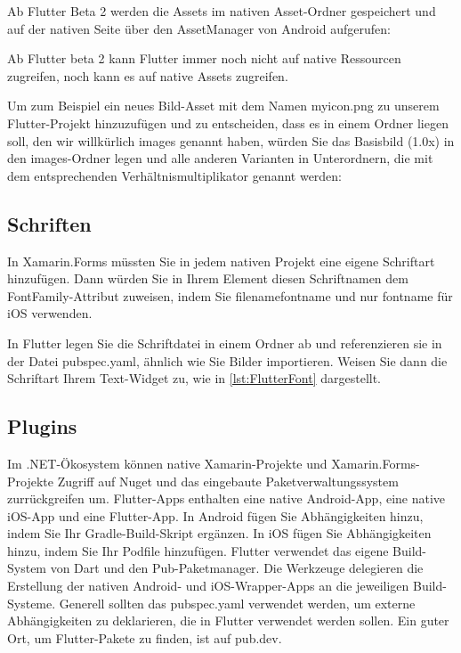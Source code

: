 Ab Flutter Beta 2 werden die Assets im nativen Asset-Ordner gespeichert und auf der nativen Seite über den AssetManager von Android aufgerufen:

Ab Flutter beta 2 kann Flutter immer noch nicht auf native Ressourcen zugreifen, noch kann es auf native Assets zugreifen.

Um zum Beispiel ein neues Bild-Asset mit dem Namen myicon.png zu unserem Flutter-Projekt hinzuzufügen und zu entscheiden, dass es in einem Ordner liegen soll, den wir willkürlich images genannt haben, würden Sie das Basisbild (1.0x) in den images-Ordner legen und alle anderen Varianten in Unterordnern, die mit dem entsprechenden Verhältnismultiplikator genannt werden:
\subsection{Schriften}
In Xamarin.Forms müssten Sie in jedem nativen Projekt eine eigene Schriftart hinzufügen. Dann würden Sie in Ihrem Element diesen Schriftnamen dem FontFamily-Attribut zuweisen, indem Sie filenamefontname und nur fontname für iOS verwenden.

In Flutter legen Sie die Schriftdatei in einem Ordner ab und referenzieren sie in der Datei pubspec.yaml, ähnlich wie Sie Bilder importieren.
Weisen Sie dann die Schriftart Ihrem Text-Widget zu, wie in  \ref{lst:FlutterFont} dargestellt. 

\begin{minipage}{\linewidth}

\end{minipage}

\subsection{Plugins}
Im .NET-Ökosystem können native Xamarin-Projekte und Xamarin.Forms-Projekte Zugriff auf Nuget und das eingebaute Paketverwaltungssystem zurrückgreifen um.  Flutter-Apps enthalten eine native Android-App, eine native iOS-App und eine Flutter-App.
In Android fügen Sie Abhängigkeiten hinzu, indem Sie Ihr Gradle-Build-Skript ergänzen. In iOS fügen Sie Abhängigkeiten hinzu, indem Sie Ihr Podfile hinzufügen.
Flutter verwendet das eigene Build-System von Dart und den Pub-Paketmanager. Die Werkzeuge delegieren die Erstellung der nativen Android- und iOS-Wrapper-Apps an die jeweiligen Build-Systeme.
Generell sollten das pubspec.yaml verwendet werden, um externe Abhängigkeiten zu deklarieren, die in Flutter verwendet werden sollen. Ein guter Ort, um Flutter-Pakete zu finden, ist auf pub.dev.

